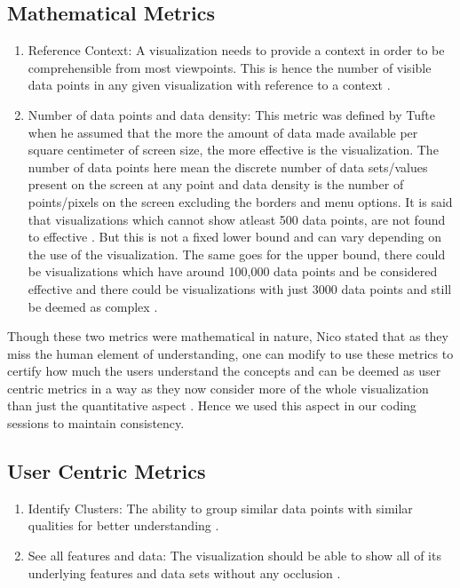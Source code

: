 \documentclass[seploa]{beavtex}
\begin{document}
\subsection{Mathematical Metrics}

\begin{enumerate}
\item Reference Context: A visualization needs to provide a context in order to be comprehensible from most viewpoints. This is hence the number of visible data points in any given visualization with reference to a context \cite{brath1997}.

\item Number of data points and data density: This metric was defined by Tufte when he assumed that the more the amount of data made available per square centimeter of screen size, the more effective is the visualization. The number of data points here mean the discrete number of data sets/values present on the screen at any point and data density is the number of points/pixels on the screen excluding the borders and menu options. It is said that visualizations which cannot show atleast 500 data points, are not found to effective \cite{brath1997}. But this is not a fixed lower bound and can vary depending on the use of the visualization. The same goes for the upper bound, there could be visualizations which have around 100,000 data points and be considered effective and there could be visualizations with just 3000 data points and still be deemed as complex \cite{brath1997}.
\end{enumerate}

Though these two metrics were mathematical in nature, Nico stated that as they miss the human element of understanding, one can modify to use these metrics to certify how much the users understand the concepts and can be deemed as user centric metrics in a way as they now consider more of the whole visualization than just the quantitative aspect \cite{nico2007, brath1997}. Hence we used this aspect in our coding sessions to maintain consistency.

\subsection{User Centric Metrics}

\begin{enumerate}
\item Identify Clusters: The ability to group similar data points with similar qualities for better understanding \cite{grins2001}.

\item See all features and data: The visualization should be able to show all of its underlying features and data sets without any occlusion \cite{grins2001}.
\end{enumerate}
\end{document}

